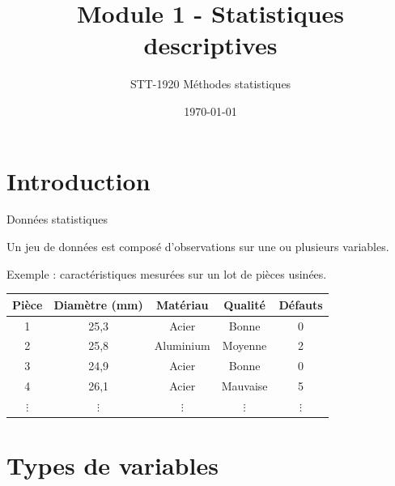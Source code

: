\documentclass{BeamerTemplate}
\title{Module 1 - Statistiques descriptives}
\subtitle{STT-1920 Méthodes statistiques}
\date{\today}
\begin{document}
\begin{frame}[t]
  \titlepage
\end{frame}

\section{Introduction}

\begin{frame}[t]{Données statistiques}

Un jeu de données est composé d'\alert{observations} sur une ou plusieurs \alert{variables}.

\bigskip
Exemple : caractéristiques mesurées sur un lot de pièces usinées.

{\small
\begin{center}
\begin{tabular}{ccccc}\hline
Pièce & Diamètre (mm) & Matériau & Qualité & Défauts \\ \hline
1 & 25{,}3 & Acier & Bonne & 0 \\
2 & 25{,}8 & Aluminium & Moyenne & 2 \\
3 & 24{,}9 & Acier & Bonne & 0 \\
4 & 26{,}1 & Acier & Mauvaise & 5 \\
$\vdots$ & $\vdots$ & $\vdots$ & $\vdots$ & $\vdots$ \\\hline
\end{tabular}
\end{center}
}

\end{frame}

\section{Types de variables}
\end{document}

